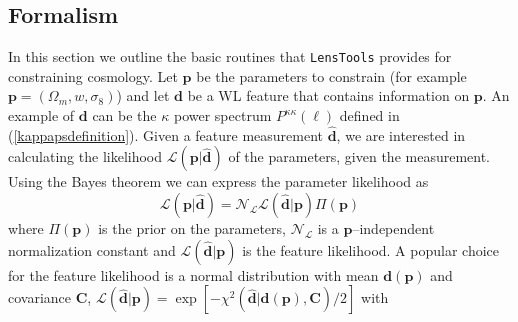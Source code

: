 \documentclass[5p]{elsarticle}
\newcommand{\bb}[1]{\mathbf{#1}}
\newcommand{\bbh}[1]{\mathbf{\hat{#1}}}
\newcommand{\LT}{\texttt{LensTools} }
\begin{document}
\subsection{Formalism}
%
In this section we outline the basic routines that \LT provides for constraining cosmology. Let $\bb{p}$ be the parameters to constrain (for example $\bb{p}=(\Omega_m,w,\sigma_8)$) and let $\bb{d}$ be a WL feature that contains information on $\bb{p}$. An example of $\bb{d}$ can be the $\kappa$ power spectrum $P^{\kappa\kappa}(\ell)$ defined in (\ref{kappapsdefinition}). Given a feature measurement $\bbh{d}$, we are interested in calculating the likelihood $\mathcal{L}(\bb{p}\vert\bbh{d})$ of the parameters, given the measurement. Using the Bayes theorem we can express the parameter likelihood as 
\begin{equation}
\label{parameterlikelihood}
\mathcal{L}(\bb{p}\vert\bbh{d}) = \mathcal{N}_\mathcal{L}\mathcal{L}(\bbh{d}\vert\bb{p})\Pi(\bb{p})
\end{equation} 
%
where $\Pi(\bb{p})$ is the prior on the parameters, $\mathcal{N}_\mathcal{L}$ is a $\bb{p}$--independent normalization constant and $\mathcal{L}(\bbh{d}\vert\bb{p})$ is the feature likelihood. A popular choice for the feature likelihood is a normal distribution with mean $\bb{d}(\bb{p})$ and covariance $\bb{C}$, $\mathcal{L}(\bbh{d}\vert\bb{p}) = \exp{\left[-\chi^2\left(\bbh{d}\vert\bb{d}(\bb{p}),\bb{C}\right)/2\right]}$ with
\end{document}
